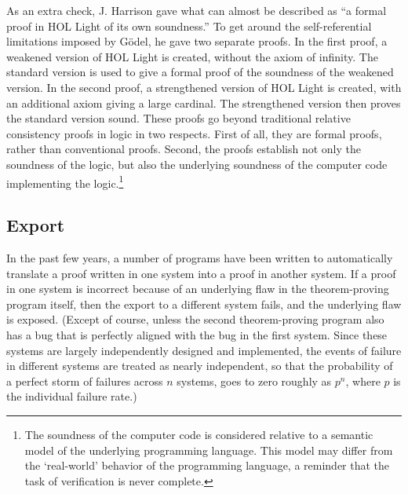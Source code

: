 \documentclass{llncs}
\begin{document}
As an extra check, J. Harrison gave what can almost be described as 
``a formal proof in HOL Light of its own soundness.''   To get around the self-referential limitations
imposed by G\"odel, he gave two separate proofs.  In the first proof, a weakened
version of HOL Light is created, without the axiom of infinity.  The standard version is
used to give a formal proof of the soundness of the weakened version.  In the second proof, a strengthened
version of HOL Light is created, with an additional axiom giving a large cardinal.  The strengthened
version then proves the standard version sound.  These proofs go beyond traditional relative consistency
proofs in logic in two respects.  First of all, they are formal proofs, rather than conventional proofs.
Second, the proofs establish not only the soundness of the logic, but also the underlying soundness
of the computer code implementing the logic.\footnote{The soundness of the computer code is considered
relative to a semantic model of the underlying programming language.  This model may differ from
the `real-world' behavior of the programming language, a reminder that the task of verification
is never complete.}

\subsection{Export}

In the past few years, a number of
programs have been written to automatically translate a proof written in one system into
a proof in another system.  If a proof in one system is incorrect because of an underlying
flaw in the theorem-proving program itself, then the export to
a different system fails, and the underlying flaw is exposed.  (Except of course,
unless the second theorem-proving program also has a bug that is perfectly aligned with the
bug in the first system.  Since these systems are largely independently designed and implemented, 
the events of failure in different systems are
treated as nearly independent, so that the probability of a perfect
storm of failures across $n$ systems, goes to zero roughly as $p^n$, where $p$ is the individual
failure rate.)
\end{document}
